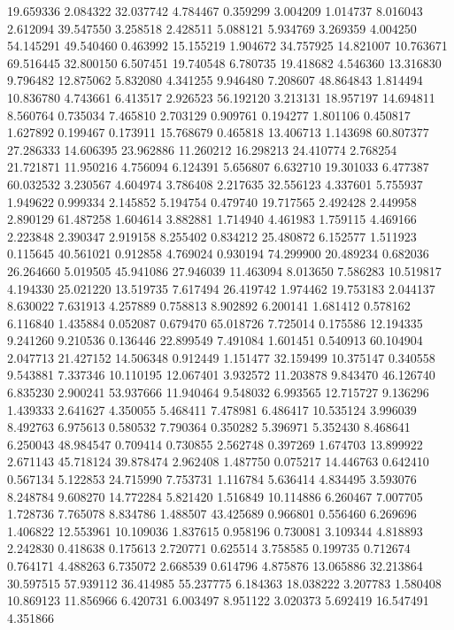 19.659336
2.084322
32.037742
4.784467
0.359299
3.004209
1.014737
8.016043
2.612094
39.547550
3.258518
2.428511
5.088121
5.934769
3.269359
4.004250
54.145291
49.540460
0.463992
15.155219
1.904672
34.757925
14.821007
10.763671
69.516445
32.800150
6.507451
19.740548
6.780735
19.418682
4.546360
13.316830
9.796482
12.875062
5.832080
4.341255
9.946480
7.208607
48.864843
1.814494
10.836780
4.743661
6.413517
2.926523
56.192120
3.213131
18.957197
14.694811
8.560764
0.735034
7.465810
2.703129
0.909761
0.194277
1.801106
0.450817
1.627892
0.199467
0.173911
15.768679
0.465818
13.406713
1.143698
60.807377
27.286333
14.606395
23.962886
11.260212
16.298213
24.410774
2.768254
21.721871
11.950216
4.756094
6.124391
5.656807
6.632710
19.301033
6.477387
60.032532
3.230567
4.604974
3.786408
2.217635
32.556123
4.337601
5.755937
1.949622
0.999334
2.145852
5.194754
0.479740
19.717565
2.492428
2.449958
2.890129
61.487258
1.604614
3.882881
1.714940
4.461983
1.759115
4.469166
2.223848
2.390347
2.919158
8.255402
0.834212
25.480872
6.152577
1.511923
0.115645
40.561021
0.912858
4.769024
0.930194
74.299900
20.489234
0.682036
26.264660
5.019505
45.941086
27.946039
11.463094
8.013650
7.586283
10.519817
4.194330
25.021220
13.519735
7.617494
26.419742
1.974462
19.753183
2.044137
8.630022
7.631913
4.257889
0.758813
8.902892
6.200141
1.681412
0.578162
6.116840
1.435884
0.052087
0.679470
65.018726
7.725014
0.175586
12.194335
9.241260
9.210536
0.136446
22.899549
7.491084
1.601451
0.540913
60.104904
2.047713
21.427152
14.506348
0.912449
1.151477
32.159499
10.375147
0.340558
9.543881
7.337346
10.110195
12.067401
3.932572
11.203878
9.843470
46.126740
6.835230
2.900241
53.937666
11.940464
9.548032
6.993565
12.715727
9.136296
1.439333
2.641627
4.350055
5.468411
7.478981
6.486417
10.535124
3.996039
8.492763
6.975613
0.580532
7.790364
0.350282
5.396971
5.352430
8.468641
6.250043
48.984547
0.709414
0.730855
2.562748
0.397269
1.674703
13.899922
2.671143
45.718124
39.878474
2.962408
1.487750
0.075217
14.446763
0.642410
0.567134
5.122853
24.715990
7.753731
1.116784
5.636414
4.834495
3.593076
8.248784
9.608270
14.772284
5.821420
1.516849
10.114886
6.260467
7.007705
1.728736
7.765078
8.834786
1.488507
43.425689
0.966801
0.556460
6.269696
1.406822
12.553961
10.109036
1.837615
0.958196
0.730081
3.109344
4.818893
2.242830
0.418638
0.175613
2.720771
0.625514
3.758585
0.199735
0.712674
0.764171
4.488263
6.735072
2.668539
0.614796
4.875876
13.065886
32.213864
30.597515
57.939112
36.414985
55.237775
6.184363
18.038222
3.207783
1.580408
10.869123
11.856966
6.420731
6.003497
8.951122
3.020373
5.692419
16.547491
4.351866

